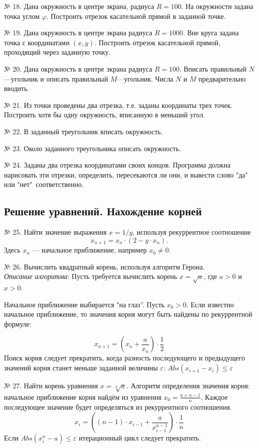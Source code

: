 № 18. Дана окружность в центре экрана, радиуса $R=100$.  На окружности задана точка углом $\varphi$. Построить отрезок касательной прямой в заданной точке.

№ 19. Дана окружность в центре экрана радиуса $R=100$0. Вне круга задана точка с координатами $(x,y)$. Построить отрезок касательной прямой, проходящий через заданную точку.

№ 20. Дана окружность в центре экрана радиуса $R=100$. Вписать правильный $N$ ---угольник и описать правильный $M$---угольник. Числа $N$ и $M$ предварительно вводить.

№ 21. Из точки проведены два отрезка, т.е. заданы координаты трех точек. Построить хотя бы одну окружность, вписанную в меньший угол.

№ 22. В заданный треугольник вписать окружность.

№ 23. Около заданного треугольника описать окружность.

№ 24. Заданы два отрезка координатами своих концов. Программа должна нарисовать эти отрезки, определить, пересекаются ли они, и вывести слово "да" \: или "нет"\ соответственно. 

\subsection{Решение уравнений. Нахождение корней}

\hspace{7mm} № 25. Найти значение выражения $x = 1/y$, используя рекуррентное соотношение 
$$x_{n+1} = x_n\cdot (2 - y\cdot x_n).$$ 
Здесь $x_n$ --- начальное приближение, например $x_0\neq 0$.

№ 26. Вычислить квадратный корень, используя алгоритм Герона.\\ {\it Описание алгоритма}: Пусть требуется вычислить корень $x = \sqrt{a}$, где $a>0$ и $x>0$.
 
Начальное   приближение выбирается "на глаз”. Пусть  $x_0 > 0$. Если известно начальное приближение, то значения корня могут быть найдены по рекуррентной формуле:

$$x_{n+1} = \left(x_n + \frac{a}{x_n}\right)\cdot\frac{1}{2}$$
Поиск корня следует прекратить, когда разность последующего и предыдущего значений корня станет меньше заданной величины $\varepsilon$:
$Abs(x_{i+1}-x_i)\leq\varepsilon$

№ 27. Найти корень уравнения $x = \sqrt[n]{a}$. Алгоритм опреде­ления значения корня: начальное приближение корня  найдём из уравнения    $x_0 = \frac{a + n -1}{n} $.  Каждое последующее значение будет определяться из рекуррентного соотношения. 
$$x_i = \left((n-1)\cdot x_{i-1} + \frac{a}{x^{n-1}_{i-1}}   \right)\cdot\frac{1}{n}$$
Если $Abs(x^n_{i}-a)\leq\varepsilon$ итерационный цикл следует прекратить. 


